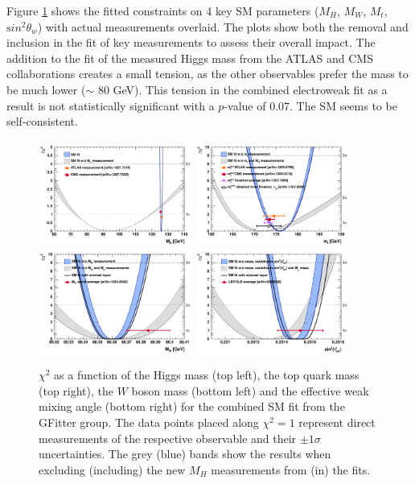 Figure \ref{figure:theory_scans} shows the fitted constraints on 4 key SM
parameters ($M_H$, $M_W$, $M_t$, ${\mathrm sin^2}\theta_w$) with
actual measurements overlaid. The plots show both the removal
and inclusion in the fit of key measurements to assess their overall
impact. The addition to the fit of the measured
Higgs mass from the ATLAS and CMS collaborations creates a small
tension, as the other observables prefer the mass to be much
lower ($\sim$ 80 GeV). This tension in the combined
electroweak fit as a result is  not statistically
significant with a $p$-value of 0.07. The
SM seems to be self-consistent. 


\begin{figure}[!t]
\centering 
\includegraphics[width=0.45\textwidth]{figs/theory/HiggsScan.pdf}
\includegraphics[width=0.45\textwidth]{figs/theory/TopScan.pdf}
\includegraphics[width=0.45\textwidth]{figs/theory/WMassScan.pdf}
\includegraphics[width=0.45\textwidth]{figs/theory/Sin2ThetaScan.pdf}
\caption{
$\chi^2$ as a function of the Higgs mass (top left), the top quark mass (top
    right), the $W$ boson mass (bottom left) and the effective weak mixing
  angle (bottom right) for the combined SM fit from the GFitter group.  The
  data points placed along $\chi^2=1$ represent direct measurements of the
  respective observable and their $\pm 1\sigma$ uncertainties.  The grey (blue)
  bands show the results when excluding (including) the new $M_H$ measurements
  from (in) the fits. } \label{figure:theory_scans}
\end{figure}


